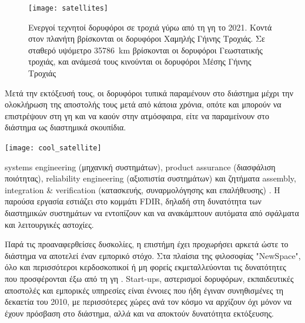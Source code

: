 \documentclass[a4paper,nobib]{tufte-book}
\begin{document}
\begin{figure}
	\centering
	\texttt{[image: satellites]}
	\caption[Ενεργοί δορυφόροι σε τροχιά γύρω από τη γη το 2021]{Ενεργοί τεχνητοί δορυφόροι σε τροχιά γύρω από τη γη το 2021. Κοντά στον πλανήτη βρίσκονται οι δορυφόροι Χαμηλής Γήινης Τροχιάς. Σε σταθερό υψόμετρο \SI{35786}{\kilo\meter} βρίσκονται οι δορυφόροι Γεωστατικής τροχιάς, και ανάμεσά τους κινούνται οι δορυφόροι Μέσης Γήινης Τροχιάς \autocite{agi:analyticalgraphics_satellite_viewer}}
	\label{fig:all_satellites}
\end{figure}

Μετά την εκτόξευσή τους, οι δορυφόροι τυπικά παραμένουν στο διάστημα μέχρι την ολοκλήρωση της αποστολής τους μετά από κάποια χρόνια, οπότε και μπορούν να επιστρέψουν στη γη και να καούν στην ατμόσφαιρα, είτε να παραμείνουν στο διάστημα ως διαστημικά σκουπίδια.

\begin{marginfigure}
	\texttt{[image: cool\_satellite]}
	\caption[Γραφική αναπαράσταση του δορυφόρου Jason-3]{Γραφική αναπαράσταση του δορυφόρου \href{https://www.flickr.com/photos/noaasatellites/16979948568}{Jason-3}. %
	}
\end{marginfigure}

 systems engineering (μηχανική συστημάτων), product assurance (διασφάλιση ποιότητας), reliability engineering (αξιοπιστία συστημάτων) και ζητήματα assembly, integration \& verification (κατασκευής, συναρμολόγησης και επαλήθευσης) \autocite{smad}. Η παρούσα εργασία εστιάζει στο κομμάτι \acf{FDIR}, δηλαδή στη δυνατότητα των διαστημικών συστημάτων να εντοπίζουν και να ανακάμπτουν αυτόματα από σφάλματα και λειτουργικές αστοχίες.

Παρά τις προαναφερθείσες δυσκολίες, η επιστήμη έχει προχωρήσει αρκετά ώστε το διάστημα να αποτελεί έναν εμπορικό στόχο. Στα πλαίσια της φιλοσοφίας "NewSpace", όλο και περισσότεροι κερδοσκοπικοί ή μη φορείς εκμεταλλεύονται τις δυνατότητες που προσφέρονται έξω από τη γη \autocite{denis_new_space_2020}. Start-ups, αστερισμοί δορυφόρων, εκπαιδευτικές αποστολές και εμπορικές υπηρεσίες είναι έννοιες που ήδη έγιναν συνηθισμένες τη δεκαετία του 2010, με περισσότερες χώρες ανά τον κόσμο να αρχίζουν όχι μόνον να έχουν πρόσβαση στο διάστημα, αλλά και να αποκτούν δυνατότητα εκτόξευσης.
\end{document}
